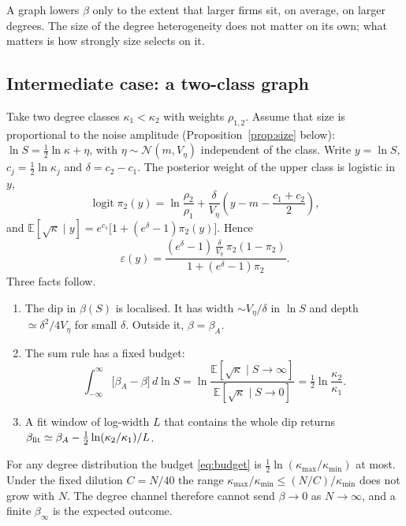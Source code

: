 \documentclass[11pt]{article}
\newcommand{\E}{\mathbb E}
\theoremstyle{remark}
\begin{document}
A graph lowers $\beta$ only to the extent that larger firms sit, on average, on larger degrees.
The size of the degree heterogeneity does not matter on its own; what matters is how strongly
size selects on it.

\subsection{Intermediate case: a two-class graph}

Take two degree classes $\kappa_1<\kappa_2$ with weights $\rho_{1,2}$.  Assume that size is
proportional to the noise amplitude (Proposition~\ref{prop:size} below):
$\ln S=\tfrac12\ln\kappa+\eta$, with $\eta\sim\mathcal N(m,V_\eta)$ independent of the class.
Write $y=\ln S$, $c_j=\tfrac12\ln\kappa_j$ and $\delta=c_2-c_1$.  The posterior weight of the
upper class is logistic in $y$,
\begin{equation}
  \operatorname{logit}\pi_2(y)=\ln\frac{\rho_2}{\rho_1}
     +\frac{\delta}{V_\eta}\left(y-m-\frac{c_1+c_2}{2}\right),
\end{equation}
and $\E[\sqrt\kappa\mid y]=e^{c_1}\bigl[1+(e^\delta-1)\pi_2(y)\bigr]$.  Hence
\begin{equation}
  \varepsilon(y)=\frac{(e^\delta-1)\,\tfrac{\delta}{V_\eta}\,\pi_2(1-\pi_2)}
                      {1+(e^\delta-1)\pi_2}.
\end{equation}
Three facts follow.
\begin{enumerate}
  \item The dip in $\beta(S)$ is localised.  It has width $\sim V_\eta/\delta$ in $\ln S$ and
        depth $\simeq\delta^2/4V_\eta$ for small $\delta$.  Outside it, $\beta=\beta_A$.
  \item The sum rule has a fixed budget:
        \begin{equation}
          \int_{-\infty}^{\infty}\bigl[\beta_A-\beta\bigr]\,d\ln S
          =\ln\frac{\E[\sqrt\kappa\mid S\to\infty]}{\E[\sqrt\kappa\mid S\to0]}
          =\tfrac12\ln\frac{\kappa_2}{\kappa_1}.
          \label{eq:budget}
        \end{equation}
  \item A fit window of log-width $L$ that contains the whole dip returns
        $\beta_{\rm fit}\simeq\beta_A-\tfrac12\ln(\kappa_2/\kappa_1)/L$.
\end{enumerate}

For any degree distribution the budget \eqref{eq:budget} is
$\tfrac12\ln(\kappa_{\max}/\kappa_{\min})$ at most.  Under the fixed dilution $C=N/40$ the range
$\kappa_{\max}/\kappa_{\min}\le(N/C)/\kappa_{\min}$ does not grow with $N$.  The degree channel
therefore cannot send $\beta\to0$ as $N\to\infty$, and a finite $\beta_\infty$ is the expected
outcome.
\end{document}
